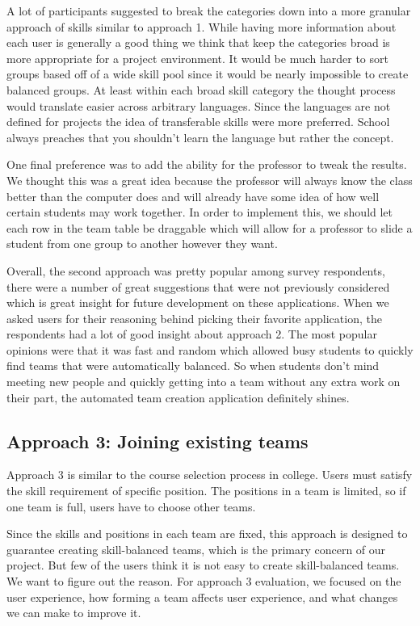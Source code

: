 \documentclass[conference]{IEEEtran}
\begin{document}
A lot of participants suggested to break the categories down into a more granular approach of skills similar to approach 1. While having more information about each user is generally a good thing we think that keep the categories broad is more appropriate for a project environment. It would be much harder to sort groups based off of a wide skill pool since it would be nearly impossible to create balanced groups. At least within each broad skill category the thought process would translate easier across arbitrary languages. Since the languages are not defined for projects the idea of transferable skills were more preferred. School always preaches that you shouldn't learn the language but rather the concept. 

One final preference was to add the ability for the professor to tweak the results. We thought this was a great idea because the professor will always know the class better than the computer does and will already have some idea of how well certain students may work together. In order to implement this, we should let each row in the team table be draggable which will allow for a professor to slide a student from one group to another however they want. 

Overall, the second approach was pretty popular among survey respondents, there were a number of great suggestions that were not previously considered which is great insight for future development on these applications. When we asked users for their reasoning behind picking their favorite application, the respondents had a lot of good insight about approach 2. The most popular opinions were that it was fast and random which allowed busy students to quickly find teams that were automatically balanced. So when students don't mind meeting new people and quickly getting into a team without any extra work on their part, the automated team creation application definitely shines. 

\subsection{Approach 3: Joining existing teams}
Approach 3 is similar to the course selection process in college. Users must satisfy the skill requirement of specific position. The positions in a team is limited, so if one team is full, users have to choose other teams. 

Since the skills and positions in each team are fixed, this approach is designed to guarantee creating skill-balanced teams, which is the primary concern of our project. But few of the users think it is not easy to create skill-balanced teams. We want to figure out the reason. For approach 3 evaluation, we focused on the user experience, how forming a team affects user experience, and what changes we can make to improve it.
\end{document}
